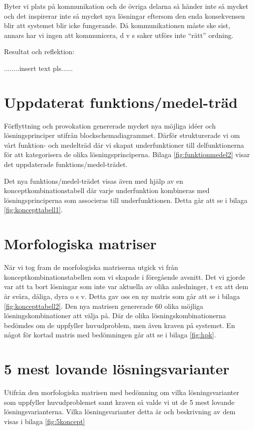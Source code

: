\documentclass[11pt, a4paper]{report}
\begin{document}
Byter vi plats på kommunikation och de övriga delarna så händer inte så mycket och det inspirerar inte så mycket nya lösningar eftersom den enda konsekvensen blir att systemet blir icke fungerande. Då kommunikationen måste ske sist, annars har vi ingen att kommunicera, d v s saker utförs inte “rätt” ordning.

Resultat och reflektion:


........insert text pls......


\section{Uppdaterat funktions/medel-träd}

Förflyttning och provokation genererade mycket nya möjliga idéer och lösningsprinciper utifrån blockschemadiagrammet. Därför strukturerade vi om vårt funktion- och medelträd där vi skapat underfunktioner till delfunktionerna för att kategorisera de olika lösningsprinciperna. Bilaga \ref{fig:funktionmedel2} visar det uppdaterade funktions/medel-trädet.

Det nya funktions/medel-trädet visas även med hjälp av en konceptkombinationstabell där varje underfunktion kombineras med lösningsprinciperna som associeras till underfunktionen. Detta går att se i bilaga \ref{fig:koncepttabell1}.


\section{Morfologiska matriser}

När vi tog fram de morfologiska matriserna utgick vi från konceptkombinationstabellen som vi skapade i föregående avsnitt. Det vi gjorde var att ta bort lösningar som inte var aktuella av olika anledninger, t ex att dem är svåra, dåliga, dyra o s v. Detta gav oss en ny matris som går att se i bilaga \ref{fig:koncepttabell2}. Den nya matrisen genererade 60 olika möjliga lösningskombinationer att välja på. Där de olika lösningskombinationerna bedömdes om de uppfyller huvudproblem, men även kraven på systemet. En något för kortad matris med bedömningen går att se i bilaga \ref{fig:hpk}.

\section{5 mest lovande lösningsvarianter}

Utifrån den morfologiska matrisen med bedömning om vilka lösningsvarianter som uppfyller huvudproblemet samt kraven så valde vi ut de 5 mest lovande lösningsvarianterna. Vilka lösningsvarianter detta är och beskrivning av dem visas i bilaga \ref{fig:5koncept}
\end{document}

